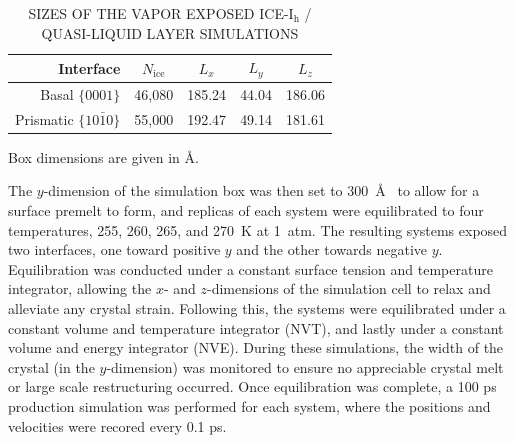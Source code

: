 \begin{table}[h]
\centering
\caption{SIZES OF THE VAPOR EXPOSED ICE-I$_\mathrm{h}$ / QUASI-LIQUID
  LAYER SIMULATIONS\label{tab:qll-method}}
\begin{threeparttable}
\begin{tabular}{rcccc}
\hline
\hline
 Interface & $N_\mathrm{ice}$ & $L_x$ & $L_y$ & $L_z$ \\
\hline
Basal  $\{0001\}$                           & 46,080 & 185.24 & 44.04 & 186.06 \\
Prismatic  $\{10\bar{1}0\}$            & 55,000 & 192.47 & 49.14 & 181.61\\
\hline
\hline
\end{tabular}
\begin{tablenotes}
      \small
    \item Box dimensions are given in \AA.
\end{tablenotes}
\end{threeparttable}
\end{table}


The $y$-dimension of the simulation box was then set to 300~\AA~ to
allow for a surface premelt to form, and replicas of each system were
equilibrated to four temperatures, 255, 260, 265, and 270~K at
1~atm. The resulting systems exposed two interfaces, one toward
positive $y$ and the other towards negative $y$. Equilibration was
conducted under a constant surface tension and temperature integrator,
allowing the $x$- and $z$-dimensions of the simulation cell to relax
and alleviate any crystal strain. Following this, the systems were
equilibrated under a constant volume and temperature integrator (NVT),
and lastly under a constant volume and energy integrator (NVE). During
these simulations, the width of the crystal (in the $y$-dimension) was
monitored to ensure no appreciable crystal melt or large scale
restructuring occurred. Once equilibration was complete, a 100 ps
production simulation was performed for each system, where the
positions and velocities were recored every 0.1 ps.




